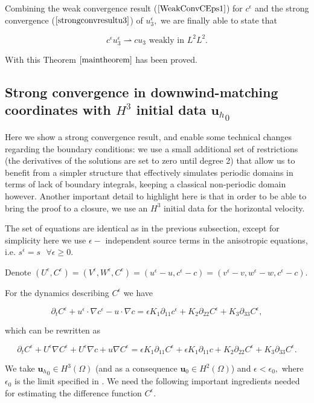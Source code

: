 \documentclass[11pt]{article}
\begin{document}
Combining the weak convergence result ($\ref{WeakConvCEps1}$) for $c^\epsilon$ and the strong convergence ($\ref{strongconvresultu3}$) of $u_3^\epsilon,$ we are finally able to state that

\begin{equation}c^\epsilon u_3^\epsilon \rightharpoonup c u_3 \text{ weakly in } L^2 L^2.\end{equation}

With this Theorem $\ref{maintheorem}$ has been proved.

\subsection{Strong convergence in downwind-matching coordinates with $H^3$ initial data ${\mathbf{u}_h}_0$}

Here we show a strong convergence result, and enable some technical changes regarding the boundary conditions: we use a small additional set of restrictions (the derivatives of the solutions are set to zero until degree 2) that allow us to benefit from a simpler structure that effectively simulates periodic domains in terms of lack of boundary integrals, keeping a classical non-periodic domain however. Another important detail to highlight here is that in order to be able to bring the proof to a closure, we use an $H^3$ initial data for the horizontal velocity.

The set of equations are identical as in the previous subsection, except for simplicity here we use $\epsilon-$ independent source terms in the anisotropic equations, i.e. $s^\epsilon = s \text{ } \forall \epsilon \geq 0.$

Denote $(U^\epsilon, C^\epsilon) = (V^\epsilon, W^\epsilon, C^\epsilon) = (u^\epsilon - u, c^\epsilon - c) = (v^\epsilon - v, w^\epsilon - w, c^\epsilon - c).$

For the dynamics describing $C^\epsilon$ we have

$$ \partial_t C^\epsilon + u^\epsilon \cdot \nabla c^\epsilon - u \cdot \nabla c = \epsilon K_1 \partial_{11} c^\epsilon + K_2 \partial_{22} C^\epsilon + K_3 \partial_{33} C^\epsilon,$$

which can be rewritten as

$$ \partial_t C^\epsilon + U^\epsilon \nabla C^\epsilon  + U^\epsilon \nabla c+ u \nabla C^\epsilon = \epsilon K_1 \partial_{11} C^\epsilon + \epsilon K_1 \partial_{11} c + K_2 \partial_{22} C^\epsilon + K_3 \partial_{33} C^\epsilon. $$

We take ${\mathbf{u}_h}_0 \in H^3(\Omega)$ (and as a consequence $\mathbf{u}_0 \in H^2(\Omega)$) and $\epsilon < \epsilon_0,$ where $\epsilon_0$ is the limit specified in \cite{li2019primitive}. We need the following important ingredients needed for estimating the difference function $C^\epsilon.$
\end{document}
